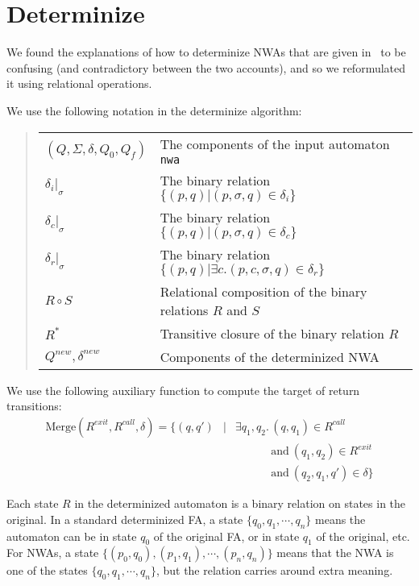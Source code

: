 \section{Determinize}
\label{App:DeterminizeAlgorithm}

We found the explanations of how to determinize NWAs that are given
in~\cite{DLT:AM2006,JACM:AM2009} to be confusing (and contradictory between
the two accounts), and so we reformulated it using relational
operations.

We use the following notation in the determinize algorithm: \\
\begin{quote}
\begin{tabular}{ll}
  $(Q, \Sigma, \delta, Q_0, Q_f)$\hspace{1em}
                                     & The components of the input automaton \texttt{nwa} \\
  $\delta_i|_\sigma$                 & The binary relation $\{(p,q) | (p, \sigma, q) \in\delta_i\}$ \\
  $\delta_c|_\sigma$                 & The binary relation $\{(p,q) | (p, \sigma, q) \in\delta_c\}$ \\
  $\delta_r|_\sigma$                 & The binary relation $\{(p,q) | \exists c. (p, c, \sigma, q) \in\delta_r\}$ \\
  $R \circ S$                        & Relational composition of the binary relations $R$ and $S$ \\
  $R^*$                              & Transitive closure of the binary relation $R$ \\
  $Q^{new}, \delta^{new}$            & Components of the determinized NWA \\
\end{tabular}
\end{quote}
We use the following auxiliary function to compute the target of
return transitions:
\begin{eqnarray*}
  \textrm{Merge}(R^{exit}, R^{call}, \delta) = \{(q, q') & |& \exists q_1, q_2.\,(q, q_1) \in R^{call} \\
                                                         &&  \phantom{\exists q_1, q_2.\,}\textrm{and}\ (q_1, q_2) \in R^{exit} \\
                                                         &&  \phantom{\exists q_1, q_2.\,}\textrm{and}\ (q_2, q_1, q') \in \delta\}
\end{eqnarray*}

Each state $R$ in the determinized automaton is a binary relation on states
in the original. In a standard determinized FA, a state $\{q_0, q_1,
\cdots, q_n\}$ means the automaton can be in state $q_0$ of the original FA, or in
state $q_1$ of the original, etc. For NWAs, a state $\{(p_0, q_0), (p_1,
q_1), \cdots, (p_n, q_n)\}$ means that the NWA is one of the states $\{q_0,
q_1, \cdots, q_n\}$, but the relation carries around extra meaning.

